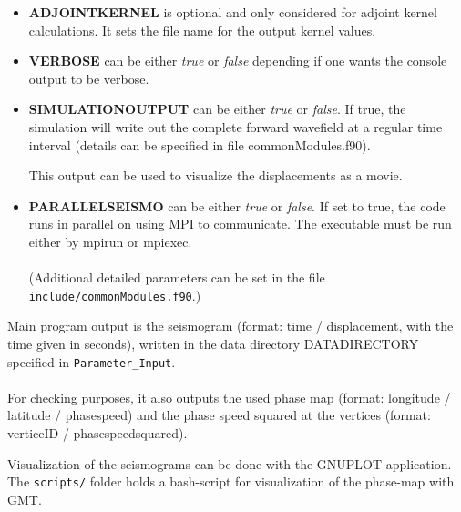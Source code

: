 \documentclass[a4paper,
                          headsepline,
                          listof=totoc,
                          toc=listof,
                          headings=small]{scrreprt} %
\begin{document}
\begin{itemize}
\item \textbf{ADJOINTKERNEL}
is optional and only considered for adjoint kernel calculations. It sets the file name
for the output kernel values.

\item \textbf{VERBOSE}
can be either \textit{true} or \textit{false} depending if one wants the console output to be verbose.

\item \textbf{SIMULATIONOUTPUT}
can be either \textit{true} or \textit{false}. If true, the simulation will write out the
complete forward wavefield at a regular time
interval (details can be specified in file commonModules.f90).

This output can be used to visualize the displacements as a movie.

\item \textbf{PARALLELSEISMO}
can be either \textit{true} or \textit{false}. If set to true, the code runs in parallel on using MPI
to communicate. The executable must be run either by mpirun or mpiexec.
\\
\\
(Additional detailed parameters can be set in the file \texttt{include/commonModules.f90}.)

\end{itemize}


Main program output is the seismogram (format: time / displacement, with the
time given in seconds),
written in the data directory DATADIRECTORY specified in \texttt{Parameter\_Input}.
\\
\\
For checking purposes, it also outputs the used phase map
(format: longitude / latitude / phasespeed)
and the phase speed squared at the vertices
(format: verticeID / phasespeedsquared).

Visualization of the seismograms can be done with the GNUPLOT application.
The \texttt{scripts/} folder holds a bash-script for visualization of the
phase-map with GMT.

\end{document}
